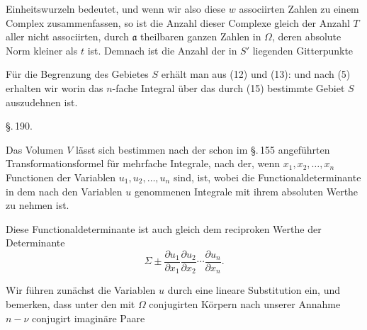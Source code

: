 Einheitswurzeln bedeutet, und wenn wir also diese $w$ associirten Zahlen zu einem Complex zusammenfassen, so ist die Anzahl dieser Complexe gleich der Anzahl $T$ aller nicht associirten, durch $\mathfrak{a}$ theilbaren ganzen Zahlen in $\Omega$, deren absolute Norm kleiner als $t$ ist. Demnach ist die Anzahl der in $S'$ liegenden Gitterpunkte

Für die Begrenzung des Gebietes $S$ erhält man aus (12) und (13):
und nach (5) erhalten wir
worin das $n$-fache Integral über das durch (15) bestimmte Gebiet $S$ auszudehnen ist.

\begin{center}
\S.\,190.

\end{center}

Das Volumen $V$ lässt sich bestimmen nach der schon im \S.\,155 angeführten Transformationsformel für mehrfache Integrale, nach der, wenn $x_1, x_2, \ldots, x_n$ Functionen der Variablen $u_1, u_2, \ldots, u_n$ sind,
ist, wobei die Functionaldeterminante in dem nach den Variablen $u$ genommenen Integrale mit ihrem absoluten Werthe zu nehmen ist.

Diese Functionaldeterminante ist auch gleich dem reciproken Werthe der Determinante
\[ \Sigma \pm \frac{\partial u_1}{\partial x_1} \frac{\partial u_2}{\partial x_2} \cdots \frac{\partial u_n}{\partial x_n}. \]

Wir führen zunächst die Variablen $u$ durch eine lineare Substitution ein, und bemerken, dass unter den mit $\Omega$ conjugirten Körpern nach unserer Annahme $n - \nu$ conjugirt imaginäre Paare
